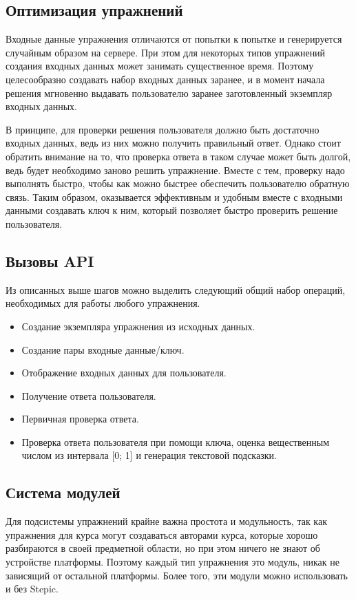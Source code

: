 \documentclass{matmex-diploma-custom}
\begin{document}
\subsection{Оптимизация упражнений}
Входные данные упражнения отличаются от попытки к попытке и
генерируется случайным образом на сервере. При этом для некоторых
типов упражнений создания входных данных может занимать существенное
время. Поэтому целесообразно создавать набор входных данных заранее, и
в момент начала решения мгновенно выдавать пользователю заранее
заготовленный экземпляр входных данных.

В принципе, для проверки решения пользователя должно быть достаточно
входных данных, ведь из них можно получить правильный ответ. Однако
стоит обратить внимание на то, что проверка ответа в таком случае
может быть долгой, ведь будет необходимо заново решить
упражнение. Вместе с тем, проверку надо выполнять быстро, чтобы как
можно быстрее обеспечить пользователю обратную связь. Таким образом,
оказывается эффективным и удобным вместе с входными данными создавать
ключ к ним, который позволяет быстро проверить решение пользователя.

\subsection{Вызовы API}
Из описанных выше шагов можно выделить следующий общий набор операций,
необходимых для работы любого упражнения.

\begin{itemize}
\item Создание экземпляра упражнения из исходных данных.
\item Создание пары входные данные/ключ.
\item Отображение входных данных для пользователя.
\item Получение ответа пользователя.
\item Первичная проверка ответа.
\item Проверка ответа пользователя при помощи ключа, оценка
  вещественным числом из интервала [0; 1] и генерация текстовой подсказки.
\end{itemize}

\subsection{Система модулей}
Для подсистемы упражнений крайне важна простота и модульность, так как
упражнения для курса могут создаваться авторами курса, которые хорошо
разбираются в своей предметной области, но при этом ничего не знают об
устройстве платформы. Поэтому каждый тип упражнения это модуль, никак
не зависящий от остальной платформы. Более того, эти модули можно
использовать и без Stepic.
\end{document}
